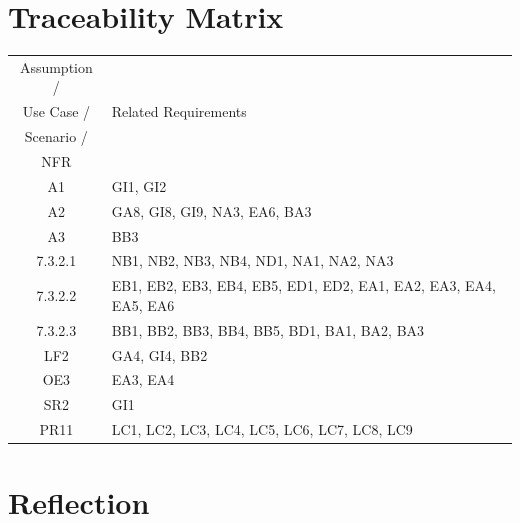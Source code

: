\documentclass[12pt]{article}
\begin{document}
\section{Traceability Matrix}
\begin{table}[H]
    \centering
    \setlength{\leftmargini}{0.4cm}
    \begin{tabularx}{\linewidth}{|c|>{\centering\arraybackslash}X|}
        \hline
        Assumption / & \\
        Use Case / & Related Requirements\\
        Scenario / & \\
        NFR & \\
        \hline
        A1 & GI1, GI2 \\
        \hline 
        A2 & GA8, GI8, GI9, NA3, EA6, BA3 \\ 
        \hline 
        A3 & BB3 \\
        \hline
        7.3.2.1 & NB1, NB2, NB3, NB4, ND1, NA1, NA2, NA3 \\
        \hline 
        7.3.2.2 & EB1, EB2, EB3, EB4, EB5, ED1, ED2, EA1, EA2, EA3, EA4, EA5, EA6 \\
        \hline
        7.3.2.3 & BB1, BB2, BB3, BB4, BB5, BD1, BA1, BA2, BA3 \\
        \hline
        LF2 & GA4, GI4, BB2 \\
        \hline
        OE3 & EA3, EA4 \\
        \hline
        SR2 & GI1 \\
        \hline
        PR11 & LC1, LC2, LC3, LC4, LC5, LC6, LC7, LC8, LC9 \\
        \hline
    \end{tabularx}
    \label{Table}
\end{table}
  
  

\appendix
\section{Reflection}
\end{document}
